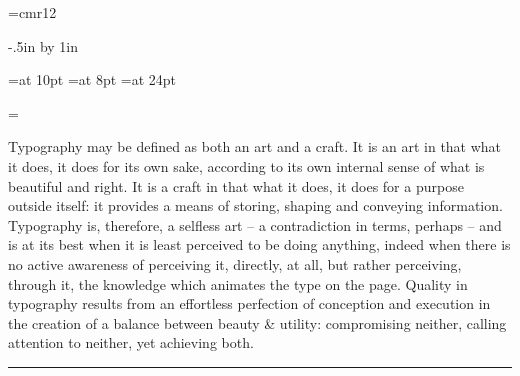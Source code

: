 
%

\newtoks\dspfont
\dspfont={cmr12} 

\def\fontname{Computer Modern 12}

\def\comment{Drawn by Donald Knuth.}

\parindent0pt
\nopagenumbers
\voffset-.5in
\advance\vsize by 1in

\font\text=\the\dspfont\space at 10pt
\font\tiny=\the\dspfont\space at 8pt
\font\name=\the\dspfont\space at 24pt

\newtoks\ntext
\newtoks\pantext
\newtoks\loremtext
%
\newbox\testbox 
%
\newdimen\bigger 
\newdimen\dspsize 
\newdimen\dspsizeincr 
\newdimen\habcwd
\newdimen\ctextsz
\newdimen\leading 
\newdimen\xheight 
\newdimen\ascheight
\newdimen{} 
\newdimen{}
\newdimen\adjust  {} 
\newdimen\dist
\newdimen\scratchdim
%
\newcount\dsplineno
\newcount\picawd
\newcount\pointwd
\newcount\spconv
\newcount\measure 
\newcount\divisor 
\newcount\scratch
\newcount\sscratch
\newcount\xascrnum
\newcount\intgp
\newcount\fracp
\newcount\scppt {}

\ntext={Typography may be defined as both
an art and a craft. It is an art in that what it does, it does for its
own sake, according to its own internal sense of what is beautiful and
right. It is a craft in that what it does, it does for a purpose
outside itself: it provides a means of storing, shaping and conveying
information. Typography is, therefore, a selfless art -- a
contradiction in terms, perhaps -- and is at its best when it is least
perceived to be doing anything, indeed when there is no active
awareness of perceiving it, directly, at all, but rather perceiving,
through it, the knowledge which animates the type on the page. Quality
in typography results from an effortless perfection of conception and
execution in the creation of a balance between beauty \& utility:
compromising neither, calling attention to neither, yet achieving
both.\thinspace\nobreak\leaders\hrule\hfill\null\par}

